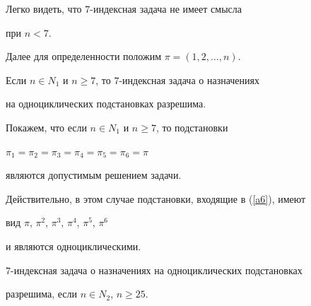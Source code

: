 Легко видеть, что $7$-индексная задача не имеет смысла


при $n<7$.





Далее для определенности положим $\pi=(1, 2, \dotsc,n)$.





\begin{lem}


\label{lm1}


Если $n\in N_1$ и $n\ge 7$, то $7$-индексная задача о назначениях


на одноциклических подстановках разрешима.


\end{lem}





\begin{pf}


Покажем, что если $n\in N_1$ и $n\ge 7$, то подстановки


$\pi_1 = \pi_2 = \pi_3 =\pi_4 = \pi_5 = \pi_6 = \pi$


являются допустимым решением задачи.


Действительно, в этом случае подстановки, входящие в (\ref{a6}), имеют


вид $\pi$, $\pi^2$, $\pi^3$, $\pi^4$, $\pi^5$, $\pi^6$


и являются одноциклическими.


\end{pf}





\begin{lem}


\label{lm2}


$7$-индексная задача о назначениях на одноциклических подстановках


разрешима, если $ n\in N_2$, $n\ge 25$.


\end{lem}





